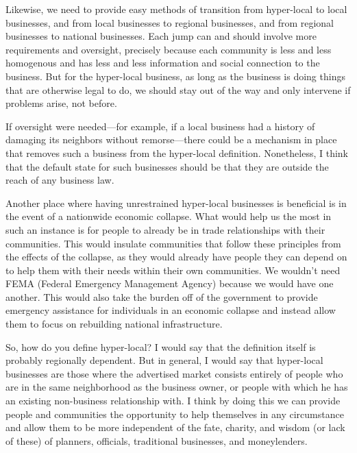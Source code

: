 \documentclass[letterpaper]{article}
\begin{document}
{\color{black}
Likewise, we need to provide easy methods of transition from hyper-local
to local businesses, and from local businesses to regional businesses,
and from regional businesses to national businesses. Each jump can and
should involve more requirements and oversight, precisely because each
community is less and less homogenous and has less and less information
and social connection to the business. But for the hyper-local
business, as long as the business is doing things that are otherwise
legal to do, we should stay out of the way and only intervene if
problems arise, not before.}

{\color{black}
\textcolor[rgb]{0.32941177,0.5529412,0.83137256}{If oversight were
needed—for example, if a local business had a history of damaging its
neighbors without remorse—there could be a mechanism in place that
removes such a business from the hyper-local definition. } Nonetheless,
I think that the default state for such businesses should be that they
are outside the reach of any business law. }

{\color{black}
Another place where having unrestrained hyper-local businesses is
beneficial is in the event of a nationwide economic collapse. What
\textcolor[rgb]{0.32941177,0.5529412,0.83137256}{would} help us the
most \textcolor[rgb]{0.32941177,0.5529412,0.83137256}{in such an
instance }is for people to already be in trade relationships with their
communities.  This
\textcolor[rgb]{0.32941177,0.5529412,0.83137256}{would} insulate
communities that follow these principles from the effects
\textcolor[rgb]{0.32941177,0.5529412,0.83137256}{of the collapse}, as
they \textcolor[rgb]{0.32941177,0.5529412,0.83137256}{would} already
have people they can depend on
\textcolor[rgb]{0.32941177,0.5529412,0.83137256}{to help them with
their needs }within their own communities. We
\textcolor[rgb]{0.32941177,0.5529412,0.83137256}{wouldn’t} need FEMA
(Federal Emergency Management Agency) because we
\textcolor[rgb]{0.32941177,0.5529412,0.83137256}{would} have one
another. This \textcolor[rgb]{0.32941177,0.5529412,0.83137256}{would}
also take the burden off of the government to provide emergency
assistance for individuals in an economic collapse and instead allow
them to focus on rebuilding national
infrastructure\textcolor[rgb]{0.32941177,0.5529412,0.83137256}{.}}

{\color{black}
So, how do you define hyper-local?  I would say that the definition
itself is probably regionally dependent. But in general, I would say
that \textcolor[rgb]{0.32941177,0.5529412,0.83137256}{hyper-local
}businesses \textcolor[rgb]{0.32941177,0.5529412,0.83137256}{are those
}where the advertised market consists entirely of people who are in the
same neighborhood as the business owner, or people with which he has an
existing non-business relationship with. I think by doing this we can
provide people and communities the opportunity to help themselves in
any circumstance and allow them to be more independent of the fate,
charity, and wisdom (or lack of these) of planners, officials,
traditional businesses, and moneylenders.}
\end{document}
